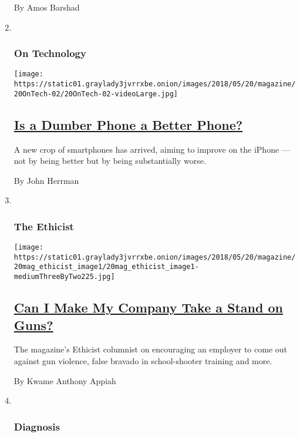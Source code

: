 \begin{enumerate}
  By Amos Barshad
\item ~
  \hypertarget{on-technology}{%
  \subsubsection{On Technology}\label{on-technology}}

  \texttt{[image: https://static01.graylady3jvrrxbe.onion/images/2018/05/20/magazine/20OnTech-02/20OnTech-02-videoLarge.jpg]}

  \hypertarget{is-a-dumber-phone-a-better-phone}{%
  \subsection{\texorpdfstring{\href{/2018/05/16/magazine/is-a-dumber-phone-a-better-phone.html}{Is
  a Dumber Phone a Better
  Phone?}}{Is a Dumber Phone a Better Phone?}}\label{is-a-dumber-phone-a-better-phone}}

  A new crop of smartphones has arrived, aiming to improve on the iPhone
  --- not by being better but by being substantially worse.

  By John Herrman
\item ~
  \hypertarget{the-ethicist}{%
  \subsubsection{The Ethicist}\label{the-ethicist}}

  \texttt{[image: https://static01.graylady3jvrrxbe.onion/images/2018/05/20/magazine/20mag\_ethicist\_image1/20mag\_ethicist\_image1-mediumThreeByTwo225.jpg]}

  \hypertarget{can-i-make-my-company-take-a-stand-on-guns}{%
  \subsection{\texorpdfstring{\href{/2018/05/16/magazine/can-i-make-my-company-take-a-stand-on-guns.html}{Can
  I Make My Company Take a Stand on
  Guns?}}{Can I Make My Company Take a Stand on Guns?}}\label{can-i-make-my-company-take-a-stand-on-guns}}

  The magazine's Ethicist columnist on encouraging an employer to come
  out against gun violence, false bravado in school-shooter training and
  more.

  By Kwame Anthony Appiah
\item ~
  \hypertarget{diagnosis}{%
  \subsubsection{Diagnosis}\label{diagnosis}}


\end{enumerate}
